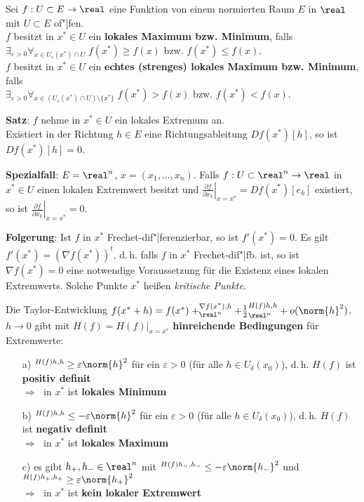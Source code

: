 Sei $f: U \subset E \rightarrow \real$ eine Funktion von einem normierten
Raum $E$ in $\real$ mit $U \subset E$ of"|fen. \\
$f$ besitzt in $x^\ast \in U$ ein \textbf{lokales Maximum bzw. Minimum},
falls \\
$\exists_{\varepsilon > 0} \forall_{x \in U_\varepsilon(x^\ast) \cap U}\;
f(x^\ast) \ge f(x)$ bzw. $f(x^\ast) \le f(x)$. \\
$f$ besitzt in $x^\ast \in U$ ein
\textbf{echtes (strenges) lokales Maximum bzw. Minimum}, falls \\
$\exists_{\varepsilon > 0} \forall_{x \in
(U_\varepsilon(x^\ast) \cap U) \setminus \{x^\ast\}}\;
f(x^\ast) > f(x)$ bzw. $f(x^\ast) < f(x)$.

\linie

\textbf{Satz}:
$f$ nehme in $x^\ast \in U$ ein lokales Extremum an. \\
Existiert in der Richtung $h \in E$ eine Richtungsableitung
$Df(x^\ast)[h]$, so ist $Df(x^\ast)[h] = 0$.

\textbf{Spezialfall}:
$E = \real^n$, $x = (x_1, \dotsc, x_n)$.
Falls $f: U \subset \real^n \rightarrow \real$ in $x^\ast \in U$ einen
lokalen Extremwert besitzt und
$\left.\frac{\partial f}{\partial x_k}\right|_{x=x^\ast} = Df(x^\ast)[e_k]$
existiert, so ist
$\left.\frac{\partial f}{\partial x_k}\right|_{x=x^\ast} = 0$.

\textbf{Folgerung}:
Ist $f$ in $x^\ast$ Frechet-dif"|ferenzierbar, so ist
$f'(x^\ast) = 0$.
Es gilt $f'(x^\ast) = (\nabla f(x^\ast))^t$, d.\,h.
falls $f$ in $x^\ast$ Frechet-dif"|fb. ist, so ist $\nabla f(x^\ast) = 0$
eine notwendige Voraussetzung für die Existenz eines lokalen Extremwerts.
Solche Punkte $x^\ast$ heißen \emph{kritische Punkte}.

\linie

Die Taylor-Entwicklung
$f(x^\ast + h) = f(x^\ast) + \sp{\nabla f(x^\ast), h}_{\real^n} +
\frac{1}{2} \sp{H(f)h, h}_{\real^n} + o(\norm{h}^2)$, $h \to 0$
gibt mit $H(f) = \left.H(f)\right|_{x=x^\ast}$
\textbf{hinreichende Bedingungen} für Extremwerte:
\begin{itemize}
    \item[a)]
    $\sp{H(f)h, h} \ge \varepsilon \norm{h}^2$ für ein $\varepsilon > 0$
    (für alle $h \in U_\delta(x_0)$), d.\,h. $H(f)$ ist
    \textbf{positiv definit} \\
    $\Rightarrow\;$ in $x^\ast$ ist \textbf{lokales Minimum}
    
    \item[b)]
    $\sp{H(f)h, h} \le -\varepsilon \norm{h}^2$ für ein $\varepsilon > 0$
    (für alle $h \in U_\delta(x_0)$), d.\,h. $H(f)$ ist
    \textbf{negativ definit} \\
    $\Rightarrow\;$ in $x^\ast$ ist \textbf{lokales Maximum}
    
    \item[c)]
    es gibt $h_+, h_- \in \real^n$ mit
    $\sp{H(f)h_-, h_-} \le -\varepsilon \norm{h_-}^2$ und
    $\sp{H(f)h_+, h_+} \ge \varepsilon \norm{h_+}^2$ \\
    $\Rightarrow\;$ in $x^\ast$ ist \textbf{kein lokaler Extremwert}
\end{itemize}

